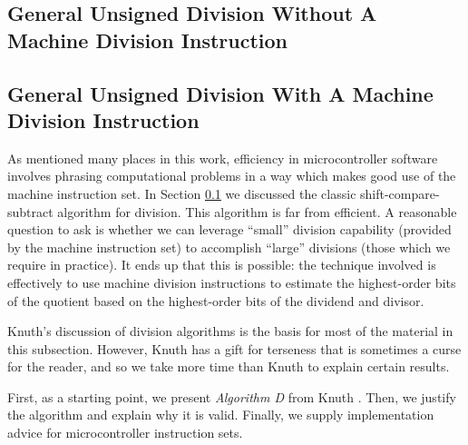 \subsection{General Unsigned Division Without A Machine Division Instruction}
\label{ccil0:sidv0:sgdn0}


\subsection{General Unsigned Division With A Machine Division Instruction}
\label{ccil0:sidv0:sgdu0}

As mentioned many places in this work, efficiency in microcontroller software
involves phrasing computational problems in a way which makes good use of
the machine instruction set.  In Section \ref{ccil0:sidv0:sgdn0} we discussed
the classic shift-compare-subtract algorithm for division.  This algorithm
is far from efficient.  A reasonable question to ask is whether we can
leverage ``small'' division capability (provided by the machine instruction set)
to accomplish ``large'' divisions (those which we require in practice).
It ends up that this is possible:  the technique involved is effectively
to use machine division instructions to estimate the highest-order bits of 
the quotient based on the highest-order bits of the dividend and divisor.

Knuth's discussion of division 
algorithms \cite[pp. 270-275]{bibref:b:knuthclassic2ndedvol2} is the
basis for most of the material in this subsection.  However, Knuth has
a gift for terseness that is sometimes a curse for the reader, and so
we take more time than Knuth to explain certain results.

First, as a starting point, we present \emph{Algorithm D} from
Knuth \cite[pp. 272-273]{bibref:b:knuthclassic2ndedvol2}.  Then,
we justify the algorithm and explain why it is valid.  Finally,
we supply implementation advice for microcontroller instruction sets.

